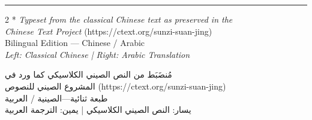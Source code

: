 \documentclass[11pt,a4paper]{article}
\newcommand{\ar}[1]{\arabicfont\beginR #1\endR}
\newcommand{\longline}{\noindent\rule{\textwidth}{0.4pt}}
\begin{document}
\vspace{1cm}
\begin{center}
\longline
\end{center}

\vspace{0.5cm}

\begin{paracol}{2}
\switchcolumn[0]*\centering
\textit{Typeset from the classical Chinese text as preserved in the}\\
\textit{Chinese Text Project} (https://ctext.org/sunzi-suan-jing)\\[3pt]
Bilingual Edition — Chinese / Arabic\\
\textit{Left: Classical Chinese | Right: Arabic Translation}

\switchcolumn
\centering
\ar{مُنضَبَط من النص الصيني الكلاسيكي كما ورد في}\\
\ar{المشروع الصيني للنصوص (https://ctext.org/sunzi-suan-jing)}\\[3pt]
\ar{طبعة ثنائية—الصينية / العربية}\\
\ar{يسار: النص الصيني الكلاسيكي | يمين: الترجمة العربية}
\end{paracol}
\end{document}
